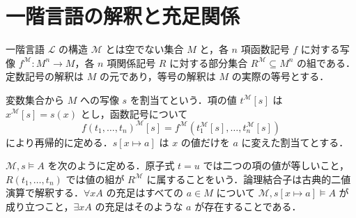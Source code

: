 \section{一階言語の解釈と充足関係}
\begin{defn}[一階構造]
一階言語 $\mathcal L$ の構造 $\mathcal M$ とは空でない集合 $M$ と，各 $n$ 項函数記号 $f$ に対する写像 $f^{\mathcal M}:M^n\to M$，各 $n$ 項関係記号 $R$ に対する部分集合 $R^{\mathcal M}\subseteq M^n$ の組である．定数記号の解釈は $M$ の元であり，等号の解釈は $M$ の実際の等号とする．
\end{defn}
\begin{defn}[変数割当てと項の値]
変数集合から $M$ への写像 $s$ を割当てという．項の値 $t^{\mathcal M}[s]$ は $x^{\mathcal M}[s]=s(x)$ とし，函数記号について
\[
 f(t_1,\ldots,t_n)^{\mathcal M}[s]=f^{\mathcal M}(t_1^{\mathcal M}[s],\ldots,t_n^{\mathcal M}[s])
\]
により再帰的に定める．$s[x\mapsto a]$ は $x$ の値だけを $a$ に変えた割当てとする．
\end{defn}
\begin{defn}[一階論理式の充足]
$\mathcal M,s\models A$ を次のように定める．原子式 $t=u$ では二つの項の値が等しいこと，$R(t_1,\ldots,t_n)$ では値の組が $R^{\mathcal M}$ に属することをいう．論理結合子は古典的二値演算で解釈する．$\forall xA$ の充足はすべての $a\in M$ について $\mathcal M,s[x\mapsto a]\models A$ が成り立つこと，$\exists xA$ の充足はそのような $a$ が存在することである．
\end{defn}
